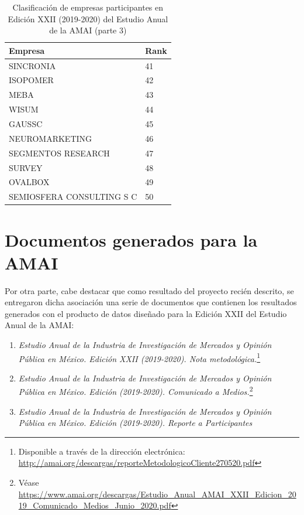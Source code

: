 \begin{center}
\begin{table}[h]
\caption{Clasificación de empresas participantes en Edición XXII (2019-2020) del Estudio Anual de la AMAI (parte 3)}
\label{tab:clasificación3}
\begin{tabular}{|l|l|}
\hline
Empresa                   & Rank \\ \hline
SINCRONIA                 & 41   \\ \hline
ISOPOMER                  & 42   \\ \hline
MEBA                      & 43   \\ \hline
WISUM                     & 44   \\ \hline
GAUSSC                    & 45   \\ \hline
NEUROMARKETING            & 46   \\ \hline
SEGMENTOS RESEARCH        & 47   \\ \hline
SURVEY                    & 48   \\ \hline
OVALBOX                   & 49   \\ \hline
SEMIOSFERA CONSULTING S C \hspace{4cm} & 50   \\ \hline
\end{tabular}
\end{table}
\end{center}

\newpage

\section{Documentos generados para la AMAI}

Por otra parte, cabe destacar que como resultado del proyecto recién descrito, se entregaron dicha asociación una serie de documentos que contienen los resultados generados con el producto de datos diseñado para la Edición XXII del Estudio Anual de la AMAI:

\begin{enumerate}
    \item \emph{Estudio Anual de la Industria de Investigación de Mercados y Opinión Pública en México. Edición XXII (2019-2020). Nota metodológica.}\footnote{Disponible a través de la dirección electrónica: \url{http://amai.org/descargas/reporteMetodologicoCliente270520.pdf}}
    \item \emph{Estudio Anual de la Industria de Investigación de Mercados y Opinión Pública en México. Edición (2019-2020). Comunicado a Medios.}\footnote{Véase \url{https://www.amai.org/descargas/Estudio_Anual_AMAI_XXII_Edicion_2019_Comunicado_Medios_Junio_2020.pdf}}
    \item \emph{Estudio Anual de la Industria de Investigación de Mercados y Opinión Pública en México. Edición (2019-2020). Reporte a Participantes}
\end{enumerate}


